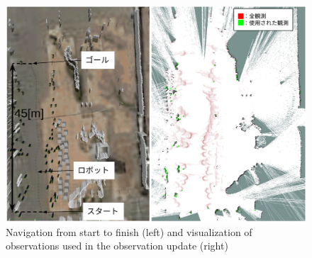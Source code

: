 \documentclass{jarticle}
\begin{document}
%
%




\begin{figure}[t]
  \centering
   \includegraphics[width=0.8\linewidth]{fig/particle_1000_observation_1_mcl.png}
   \caption{Navigation from start to finish (left) and visualization of observations used in the observation update (right)}
   \label{fig:スタートからゴールまでナビゲーション}
\end{figure}
\end{document}
